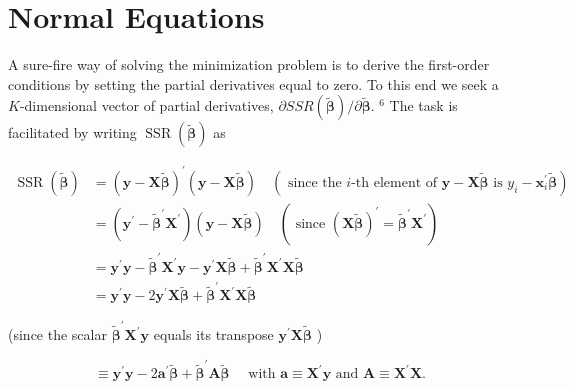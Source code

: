 \documentclass[10pt]{article}
\begin{document}
\section*{Normal Equations}
A sure-fire way of solving the minimization problem is to derive the first-order conditions by setting the partial derivatives equal to zero. To this end we seek a $K$-dimensional vector of partial derivatives, $\partial S S R(\tilde{\boldsymbol{\beta}}) / \partial \tilde{\boldsymbol{\beta}}$. ${ }^{6}$ The task is facilitated by writing $\operatorname{SSR}(\widetilde{\boldsymbol{\beta}})$ as

$$
\begin{aligned}
\operatorname{SSR}(\tilde{\boldsymbol{\beta}}) & =(\mathbf{y}-\mathbf{X} \tilde{\boldsymbol{\beta}})^{\prime}(\mathbf{y}-\mathbf{X} \tilde{\boldsymbol{\beta}}) \quad\left(\text { since the } i \text {-th element of } \mathbf{y}-\mathbf{X} \tilde{\boldsymbol{\beta}} \text { is } y_{i}-\mathbf{x}_{i}^{\prime} \tilde{\boldsymbol{\beta}}\right) \\
& =\left(\mathbf{y}^{\prime}-\tilde{\boldsymbol{\beta}}^{\prime} \mathbf{X}^{\prime}\right)(\mathbf{y}-\mathbf{X} \tilde{\boldsymbol{\beta}}) \quad\left(\text { since }(\mathbf{X} \tilde{\boldsymbol{\beta}})^{\prime}=\tilde{\boldsymbol{\beta}}^{\prime} \mathbf{X}^{\prime}\right) \\
& =\mathbf{y}^{\prime} \mathbf{y}-\tilde{\boldsymbol{\beta}}^{\prime} \mathbf{X}^{\prime} \mathbf{y}-\mathbf{y}^{\prime} \mathbf{X} \tilde{\boldsymbol{\beta}}+\tilde{\boldsymbol{\beta}}^{\prime} \mathbf{X}^{\prime} \mathbf{X} \tilde{\boldsymbol{\beta}} \\
& =\mathbf{y}^{\prime} \mathbf{y}-2 \mathbf{y}^{\prime} \mathbf{X} \tilde{\boldsymbol{\beta}}+\tilde{\boldsymbol{\beta}}^{\prime} \mathbf{X}^{\prime} \mathbf{X} \tilde{\boldsymbol{\beta}}
\end{aligned}
$$

(since the scalar $\widetilde{\boldsymbol{\beta}}^{\prime} \mathbf{X}^{\prime} \mathbf{y}$ equals its transpose $\mathbf{y}^{\prime} \mathbf{X} \widetilde{\boldsymbol{\beta}}$ )


\begin{equation*}
\equiv \mathbf{y}^{\prime} \mathbf{y}-2 \mathbf{a}^{\prime} \tilde{\boldsymbol{\beta}}+\tilde{\boldsymbol{\beta}}^{\prime} \mathbf{A} \tilde{\boldsymbol{\beta}} \quad \text { with } \mathbf{a} \equiv \mathbf{X}^{\prime} \mathbf{y} \text { and } \mathbf{A} \equiv \mathbf{X}^{\prime} \mathbf{X} . \tag{1.2.2}
\end{equation*}
\end{document}
